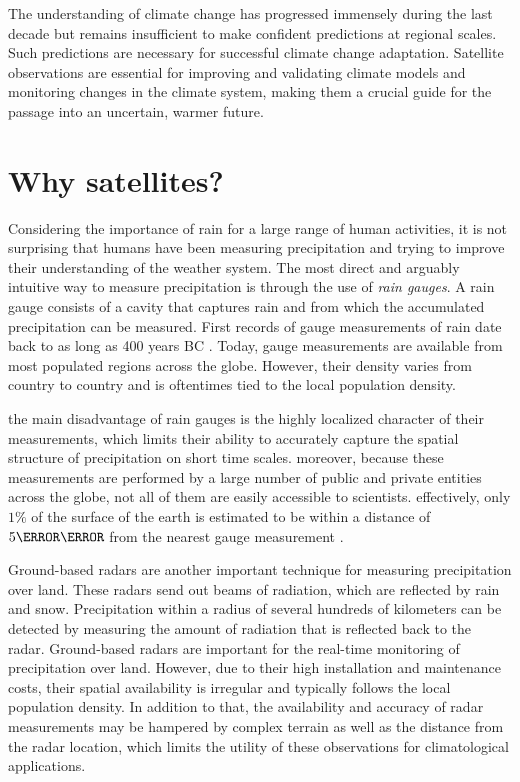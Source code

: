 The understanding of climate change has progressed immensely during the last
decade but remains insufficient to make confident predictions at regional
scales. Such predictions are necessary for successful climate change adaptation.
Satellite observations are essential for improving and validating climate models
and monitoring changes in the climate system, making them a crucial
guide for the passage into an uncertain, warmer future.

\section{Why satellites?}

Considering the importance of rain for a large range of human activities, it is
not surprising that humans have been measuring precipitation and trying to
improve their understanding of the weather system. The most direct and arguably
intuitive way to measure precipitation is through the use of \textit{rain
gauges}. A rain gauge consists of a cavity that captures rain and from which the
accumulated precipitation can be measured. First records of gauge measurements
of rain date back to as long as 400 years BC \citep{strangeways2000}. Today,
gauge measurements are available from most populated regions across the globe.
However, their density varies from country to country and is oftentimes tied to
the local population density.

the main disadvantage of rain gauges is the highly localized character of their
measurements, which limits their ability to accurately capture the spatial
structure of precipitation on short time scales. moreover, because these
measurements are performed by a large number of public and private entities
across the globe, not all of them are easily accessible to scientists.
effectively, only $\si{1}{\percent}$ of the surface of the earth is estimated to
be within a distance of $\si{5}{\kilo \meter}$ from the nearest gauge
measurement \citep{kidd17}.

Ground-based radars are another important technique for measuring precipitation
over land. These radars send out beams of radiation, which are reflected by rain
and snow. Precipitation within a radius of several hundreds of kilometers can be
detected by measuring the amount of radiation that is reflected back to the
radar. Ground-based radars are important for the real-time monitoring of
precipitation over land. However, due to their high installation and maintenance
costs, their spatial availability is irregular and typically follows the local
population density. In addition to that, the availability and accuracy of radar
measurements may be hampered by complex terrain as well as the distance from the
radar location, which limits the utility of these observations for
climatological applications.

